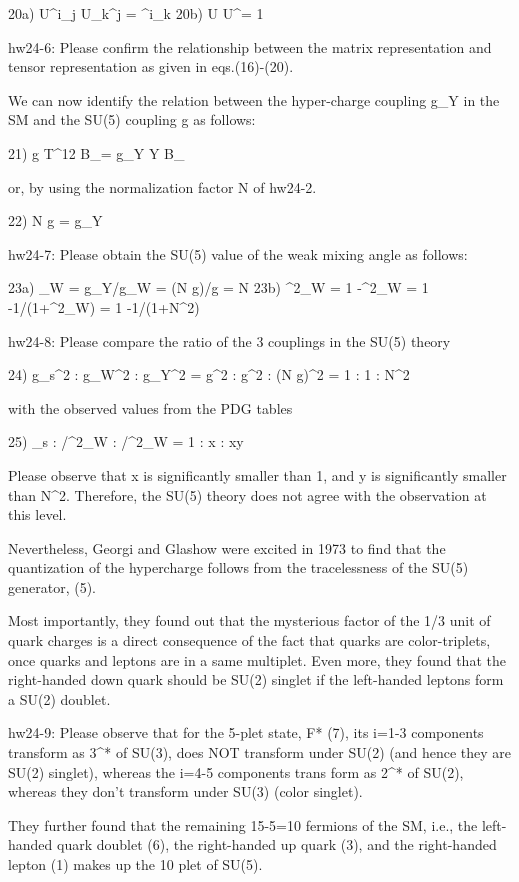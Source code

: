 \documentclass[12pt]{article}
\def\dgr{\dagger}
\begin{document}
20a) U^i_j U_k^j  = \delta^i_k
20b) U     U^\dgr = 1

hw24-6: Please confirm the relationship between the matrix representation
and tensor representation as given in eqs.(16)-(20).

We can now identify the relation between the hyper-charge coupling
g_Y in the SM and the SU(5) coupling g as follows:

21) g T^12 B_\mu = g_Y Y B_\mu

or, by using the normalization factor N of hw24-2.

22) N g = g_Y

hw24-7: Please obtain the SU(5) value of the weak mixing angle
as follows:

23a) \tan\theta_W = g_Y/g_W = (N g)/g = N
23b) \sin^2\theta_W = 1 -\cos^2\theta_W
                    = 1 -1/(1+\tan^2\theta_W)
                    = 1 -1/(1+N^2)

hw24-8: Please compare the ratio of the 3 couplings in the
SU(5) theory

24) g_s^2 : g_W^2 : g_Y^2 = g^2 : g^2 : (N g)^2
                          = 1   : 1   : N^2

with the observed values from the PDG tables

25) \alpha_s : \alpha/\sin^2\theta_W : \alpha/\cos^2\theta_W
    = 1 : x : xy

Please observe that x is significantly smaller than 1, and y is
significantly smaller than N^2.  Therefore, the SU(5) theory does
not agree with the observation at this level.

Nevertheless, Georgi and Glashow were excited in 1973 to find that
the quantization of the hypercharge follows from the tracelessness
of the SU(5) generator, (5).

Most importantly, they found out that the mysterious factor of the 1/3
unit of quark charges is a direct consequence of the fact that quarks
are color-triplets, once quarks and leptons are in a same multiplet.
Even more, they found that the right-handed down quark should be SU(2)
singlet if the left-handed leptons form a SU(2) doublet.

hw24-9: Please observe that for the 5-plet state, F* (7), its i=1-3
components transform as 3^* of SU(3), does NOT transform under SU(2)
(and hence they are SU(2) singlet), whereas the i=4-5 components trans
form as 2^* of SU(2), whereas they don't transform under SU(3)
(color singlet).

They further found that the remaining 15-5=10 fermions of the SM, i.e.,
the left-handed quark doublet (6), the right-handed up quark (3),
and the right-handed lepton (1) makes up the 10 plet of SU(5).
\end{document}
